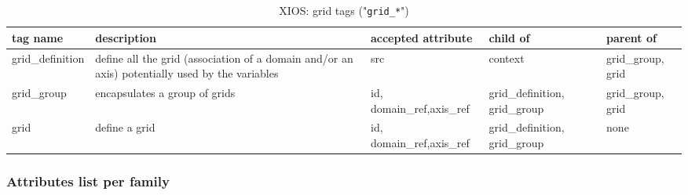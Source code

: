 \documentclass[../main/NEMO_manual]{subfiles}
\begin{document}
\begin{table}
  \begin{tabularx}{\textwidth}{|l|X|X|X|X|}
    \hline
    tag name                                                                                     &
    description                                                                                  &
    accepted attribute                                                                           &
    child of                                                                                     &
    parent of                       \\
    \hline
    \hline
    grid\_definition                                                                               &
    define all the grid (association of a domain and/or an axis) potentially used by the variables &
    src                                                                                            &
    context                                                                                        &
    grid\_group, grid	\\
    \hline
    grid\_group                                                                                    &
    encapsulates a group of grids                                                                  &
    id, domain\_ref,axis\_ref                                                                      &
    grid\_definition, grid\_group                                                                  &
    grid\_group, grid	\\
    \hline
    grid                                                                                           &
    define a grid                                                                                  &
    id, domain\_ref,axis\_ref                                                                      &
    grid\_definition, grid\_group                                                                  &
    none 					\\
    \hline
  \end{tabularx}
  \caption{XIOS: grid tags ("\texttt{grid\_*}")}
\end{table}

\subsubsection{Attributes list per family}
\end{document}
